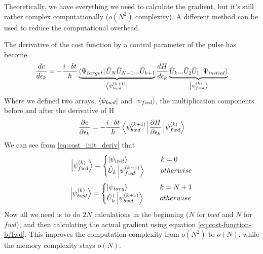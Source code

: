 Theoretically, we have everything we need to calculate the gradient, but it's still rather complex computationally ($o (N^2)$ complexity). A different method can be used to reduce the computational overhead.

The derivative of the cost function by a control parameter of the pulse has become
\begin{equation} \label{eq:cost_init_deriv}
    \frac{dc}{d\epsilon_k} = -\frac{i\cdot \delta t}{\hbar} \underbrace{\bra{\Psi_{target}}\hat{U}_N \hat{U}_{N-1}... \hat{U}_{k+1}}_{\bra{\psi_{bwd}^{ (k+1)}}}\frac{dH}{d\epsilon_k} \underbrace{\hat{U}_{k} ...\hat{U}_2 \hat{U}_1\ket{\Psi_{initial}}}_{\ket{\psi_{fwd}^{ (k)}}}
\end{equation}
Where we defined two arrays, $\bra{\psi_{bwd}}$ and $\ket{\psi_{fwd}}$, the multiplication components before and after the derivative of H
\begin{equation} \label{eq:cost-function-b/fwd}
    \frac{\partial c}{\partial \epsilon_k} =  -\frac{i\cdot \delta t}{\hbar}\bra{\psi_{bwd}^{ (k+1)}} \frac{\partial H}{\partial \epsilon_k} \ket{\psi_{fwd}^{ (k)}}
\end{equation}
We can see from \ref{eq:cost_init_deriv} that 
\[   
\ket{\psi_{fwd}^{ (k)}} = 
     \begin{cases}
       \ket{\psi_{init}} &\quad\ k=0\\
       \hat{U}_k \ket{\psi_{fwd}^{ (k-1)}} &\quad\ otherwise\\
     \end{cases}
\]
\[   
\ket{\psi_{bwd}^{ (k)}} = 
     \begin{cases}
       \ket{\psi_{targ}} &\quad\ k=N+1\\
       \hat{U}_k^{\dag{}} \ket{\psi_{bwd}^{ (k+1)}} &\quad\ otherwise\\
     \end{cases}
\]
Now all we need is to do $2N$ calculations in the beginning ($N$ for $bwd$ and $N$ for $fwd$), and then calculating the actual gradient using equation \ref{eq:cost-function-b/fwd}. This improves the computation complexity from $o (N^2)$ to $o (N)$, while the memory complexity stays $o (N)$.


